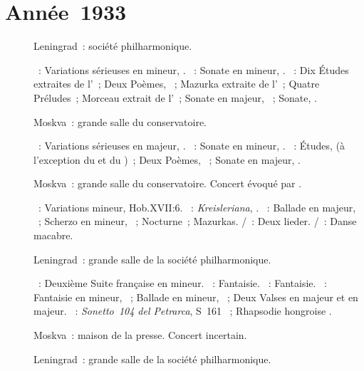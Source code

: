 \section{Année~1933}

\begin{description}
 \item[]
 Leningrad~: société philharmonique.

 \textsc{\Mendelssohn{}}~: Variations sérieuses en \kD mineur, .
 \textsc{\Chopin{}}~: Sonate en \kB mineur, .
 \textsc{\Scriabine{}}~: Dix Études extraites de l'~; Deux Poèmes,
 ~; Mazurka extraite de l'~; Quatre Préludes~; Morceau
 extrait de l'~; Sonate en \kF \Sharp majeur, ~; Sonate,
 .
 \item[]
 Moskva~: grande salle du conservatoire.

 \textsc{\Mendelssohn{}}~: Variations sérieuses en \kD majeur, .
 \textsc{\Chopin{}}~: Sonate en \kB mineur, .
 \textsc{\Scriabine{}}~: Études,  (à l'exception du  et du
 )~; Deux Poèmes, ~; Sonate en \kF \Sharp majeur,
 .
 \item[]
 Moskva~: grande salle du conservatoire.
 Concert évoqué par \citet[p.~247]{Lobanov08a}.

 \textsc{\Haydn{}}~: Variations \kF mineur, Hob.XVII:6.
 \textsc{\Schumann{}}~: \emph{Kreisleriana}, .
 \textsc{\Chopin{}}~: Ballade en \kA \Flat majeur, ~; Scherzo en
 \kC \Sharp mineur, ~; Nocturne~; Mazurkas.
 \textsc{\Schubert{}/\Liszt{}}~: Deux lieder.
 \textsc{\SaintSaens{}/\Liszt{}}~: Danse macabre.
 \item[]
 Leningrad~: grande salle de la société philharmonique.

 \textsc{\JBach{}}~: Deuxième Suite française en \kD mineur.
 \textsc{\Mozart{}}~: Fantaisie.
 \textsc{\Schubert{}}~: Fantaisie.
 \textsc{\Chopin{}}~: Fantaisie en \kF mineur, ~; Ballade en \kG
 mineur, ~; Deux Valses en \kA \Flat majeur et en \kE \Flat majeur.
 \textsc{\Liszt{}}~: \emph{Sonetto~104 del Petrarca}, S~161 ~;
 Rhapsodie hongroise .
 \item[]
 Moskva~: maison de la presse.
 Concert incertain.
 \item[]
 Leningrad~: grande salle de la société philharmonique.


\end{description}
